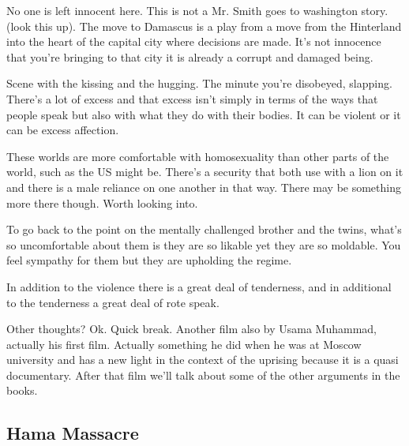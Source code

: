 \documentclass{article}
\begin{document}
\vspace{5mm}

No one is left innocent here.  This is not a Mr. Smith goes to washington story.  (look this up).  The move to Damascus is a play from a move from the Hinterland into the heart of the capital city where decisions are made.  It's not innocence that you're bringing to that city it is already a corrupt and damaged being.  

\vspace{5mm}

Scene with the kissing and the hugging.  The minute you're disobeyed, slapping.  There's a lot of excess and that excess isn't simply in terms of the ways that people speak but also with what they do with their bodies.  It can be violent or it can be excess affection.  

\vspace{5mm}

These worlds are more comfortable with homosexuality than other parts of the world, such as the US might be.  There's a security that both use with a lion on it and there is a male reliance on one another in that way.  There may be something more there though.  Worth looking into.  

\vspace{5mm}

To go back to the point on the mentally challenged brother and the twins, what's so uncomfortable about them is they are so likable yet they are so moldable.  You feel sympathy for them but they are upholding the regime.  

\vspace{5mm}

In addition to the violence there is a great deal of tenderness, and in additional to the tenderness a great deal of rote speak.  

\vspace{5mm}

Other thoughts? Ok.   Quick break.  Another film also by Usama Muhammad, actually his first film.  Actually something he did when he was at Moscow university and has a new light in the context of the uprising because it is a quasi documentary.  After that film we'll talk about some of the other arguments in the books.  

\vspace{5mm}

\subsection{Hama Massacre}
\end{document}
